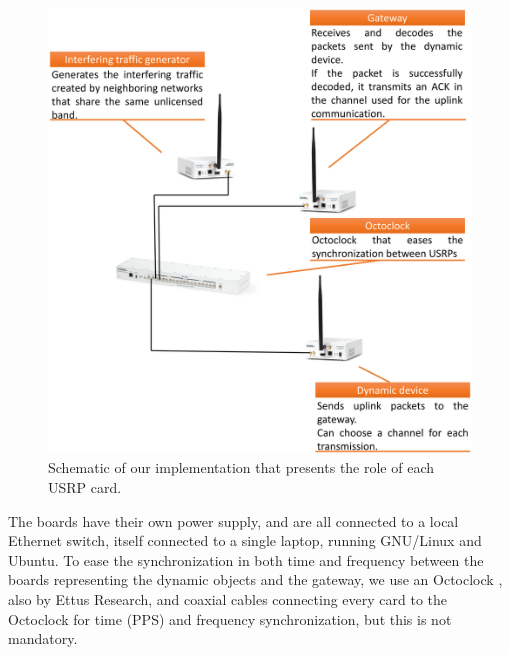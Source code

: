 \begin{figure}[!t]
    \centering
    \includegraphics[width=0.70\linewidth]{our-demo.eps}
    \caption{Schematic of our implementation that presents the role of each USRP card.}
    \label{fig:42:our_demo}
\end{figure}

The boards have their own power supply, and are all connected to a local Ethernet switch, itself connected to a single laptop, running GNU/Linux and Ubuntu.
To ease the synchronization in both time and frequency between the boards representing the dynamic objects and the gateway, we use an Octoclock \cite{OctoclockProduct}, also by Ettus Research,
and coaxial cables connecting every card to the Octoclock for time (PPS) and frequency synchronization, but this is not mandatory.


